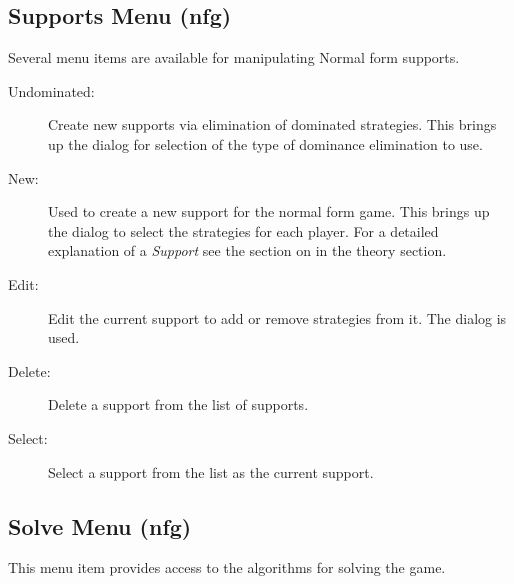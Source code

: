 \subsection{Supports Menu (nfg)}\label{nfsupports}

Several menu items are available for manipulating Normal form supports.  

\begin{description}
\item[Undominated:] Create new supports via elimination of dominated
strategies.  This brings up the  dialog for selection of the type of
dominance elimination to use.
\item[New:] Used to create a new support for the normal form game.
This brings up the  dialog to select
the strategies for each player.  For a detailed explanation of a {\em
Support} see the section on  in the
theory section.
\item[Edit:] Edit the current support to add or remove strategies from
it. The  dialog is used.  
\item[Delete:] Delete a support from the list of supports.   
\item[Select:] Select a support from the list as the current support.  
\end{description}

\subsection{Solve Menu (nfg)}\label{nfsolve}

This menu item provides access to the algorithms for solving the game. 


